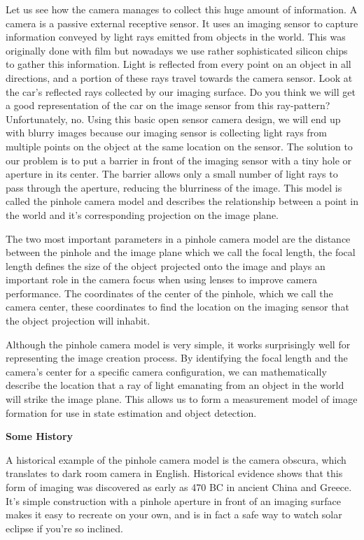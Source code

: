 Let us see how the camera manages to collect this huge amount
of information. A camera is a passive
external receptive sensor. It uses an imaging sensor
to capture information conveyed by light rays emitted
from objects in the world. This was originally done with
film but nowadays we use rather sophisticated
silicon chips to gather this information. Light is reflected
from every point on an object in all directions, and a portion of these rays travel towards the camera sensor. 
Look at the car's reflected rays collected by our imaging surface. Do you think we will get
a good representation of the car on the image sensor
from this ray-pattern? Unfortunately, no. Using this basic open
sensor camera design, we will end up with blurry images because our imaging
sensor is collecting light rays from multiple points on the object at the same
location on the sensor. The solution to our problem is to put a barrier in front of the imaging sensor
with a tiny hole or aperture in its center. The barrier allows only a small number of light rays to pass
through the aperture, reducing the blurriness
of the image. This model is called the pinhole camera model and describes the relationship between a point in
the world and it's corresponding projection on the image plane. 

The two most important parameters in a pinhole camera model are the distance between
the pinhole and the image plane which we
call the focal length, the focal length
defines the size of the object projected
onto the image and plays an important role
in the camera focus when using lenses to
improve camera performance. The coordinates of
the center of the pinhole, which we call the camera center, these coordinates to
find the location on the imaging sensor that the object projection
will inhabit. 

Although the pinhole camera model is very simple, it works surprisingly well for representing the image
creation process. By identifying
the focal length and the camera's center for
a specific camera configuration, we can mathematically describe
the location that a ray of light emanating from an object in the world will strike
the image plane. This allows us to form
a measurement model of image formation for use in state estimation
and object detection. 


\begin{framed}
\begin{remark}{\textbf{Some History}}

A historical example of the pinhole camera model
is the camera obscura, which translates to
dark room camera in English. Historical evidence shows that this form of imaging
was discovered as early as 470 BC in ancient
China and Greece. It's simple construction with a pinhole aperture in front of an imaging surface makes it
easy to recreate on your own, and is in fact a safe way to watch solar eclipse if
you're so inclined.
\end{remark}
\end{framed}


